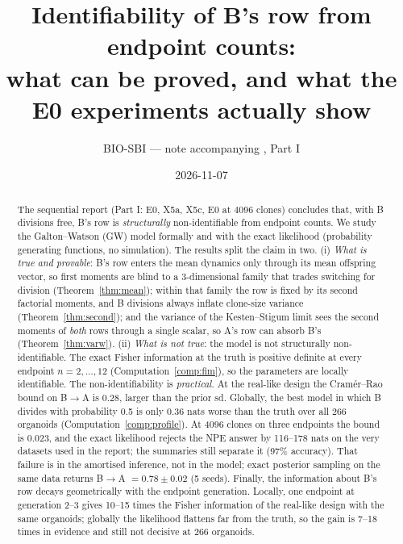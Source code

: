 \documentclass[11pt]{article}
\title{Identifiability of B's row from endpoint counts:\\ what can be proved, and what the E0 experiments actually show}
\author{BIO-SBI --- note accompanying \code{report_sequential}, Part I}
\date{2026-11-07}
\theoremstyle{definition}
\theoremstyle{remark}
\newcommand{\code}[1]{\texttt{\detokenize{#1}}}
\begin{document}
\maketitle

\begin{abstract}
The sequential report (Part I: E0, X5a, X5c, E0 at 4096 clones) concludes that, with B divisions free, B's row is \emph{structurally} non-identifiable from endpoint counts. We study the Galton--Watson (GW) model formally and with the exact likelihood (probability generating functions, no simulation). The results split the claim in two. (i) \emph{What is true and provable}: B's row enters the mean dynamics only through its mean offspring vector, so first moments are blind to a 3-dimensional family that trades switching for division (Theorem~\ref{thm:mean}); within that family the row is fixed by its second factorial moments, and B divisions always inflate clone-size variance (Theorem~\ref{thm:second}); and the variance of the Kesten--Stigum limit sees the second moments of \emph{both} rows through a single scalar, so A's row can absorb B's (Theorem~\ref{thm:varw}). (ii) \emph{What is not true}: the model is not structurally non-identifiable. The exact Fisher information at the truth is positive definite at every endpoint $n=2,\dots,12$ (Computation~\ref{comp:fim}), so the parameters are locally identifiable. The non-identifiability is \emph{practical}. At the real-like design the Cram\'er--Rao bound on B$\to$A is 0.28, larger than the prior sd. Globally, the best model in which B divides with probability 0.5 is only 0.36 nats worse than the truth over all 266 organoids (Computation~\ref{comp:profile}). At 4096 clones on three endpoints the bound is 0.023, and the exact likelihood rejects the NPE answer by 116--178 nats on the very datasets used in the report; the \code{moments} summaries still separate it (97\% accuracy). That failure is in the amortised inference, not in the model; exact posterior sampling on the same data returns B$\to$A $=0.78\pm0.02$ (5 seeds). Finally, the information about B's row decays geometrically with the endpoint generation. Locally, one endpoint at generation 2--3 gives 10--15 times the Fisher information of the real-like design with the same organoids; globally the likelihood flattens far from the truth, so the gain is 7--18 times in evidence and still not decisive at 266 organoids.
\end{abstract}

\tableofcontents

\end{document}
